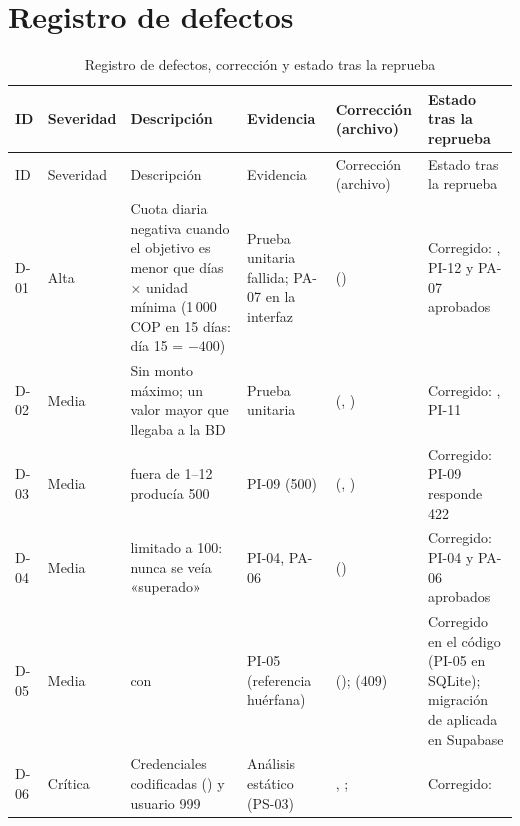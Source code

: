 \section{Registro de defectos}\label{ap:defectos}

{\scriptsize
\setlength{\tabcolsep}{3pt}
\begin{longtable}{L{0.8cm} L{1.1cm} L{3.4cm} L{2.2cm} L{3.4cm} L{2.6cm}}
\caption{Registro de defectos, corrección y estado tras la reprueba}\label{tab:defectos}\\
\toprule
ID & Severidad & Descripción & Evidencia & Corrección (archivo) & Estado tras la reprueba \\
\midrule
\endfirsthead
\toprule
ID & Severidad & Descripción & Evidencia & Corrección (archivo) & Estado tras la reprueba \\
\midrule
\endhead
\bottomrule
\endfoot
D-01 & Alta & Cuota diaria negativa cuando el objetivo es menor que días × unidad mínima (1\,000 COP en 15 días: día 15 = $-400$) & Prueba unitaria fallida; PA-07 en la interfaz &  () & Corregido: , PI-12 y PA-07 aprobados \\
D-02 & Media & Sin monto máximo; un valor mayor que  llegaba a la BD & Prueba unitaria &  (, ) & Corregido: , PI-11 \\
D-03 & Media &  fuera de 1–12 producía 500 & PI-09 (500) &  (, ) & Corregido: PI-09 responde 422 \\
D-04 & Media &  limitado a 100: nunca se veía «superado» & PI-04, PA-06 &  () & Corregido: PI-04 y PA-06 aprobados \\
D-05 & Media &   con  & PI-05 (referencia huérfana) &  ();  (409) & Corregido en el código (PI-05 en SQLite); migración de  aplicada en Supabase \\
D-06 & Crítica & Credenciales codificadas () y usuario 999 & Análisis estático (PS-03) & , ;  & Corregido:  \\

\end{longtable}}
